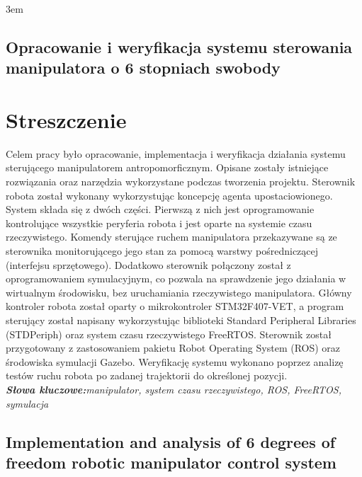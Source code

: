 \documentclass[a4paper, 12pt, twoside]{article}
\begin{document}
\emergencystretch 3em

\begin{figure}
\setlength{\voffset}{0cm}
\setlength{\hoffset}{0cm}
	
\setlength{\voffset}{-2.54cm}
\setlength{\hoffset}{-2.54cm}
\end{figure}
\mbox{}
\newpage
\thispagestyle{empty}
\mbox{}

\newpage
\begin{center}
\section*{Opracowanie i weryfikacja systemu sterowania manipulatora o 6 stopniach swobody}
\end{center}

\section*{Streszczenie}
\thispagestyle{empty}
\justify
Celem pracy było opracowanie, implementacja i weryfikacja działania systemu sterującego manipulatorem antropomorficznym. Opisane zostały istniejące rozwiązania oraz narzędzia wykorzystane podczas tworzenia projektu. Sterownik robota został wykonany wykorzystując koncepcję agenta upostaciowionego. System składa się z dwóch części. Pierwszą z nich jest oprogramowanie kontrolujące wszystkie peryferia robota i jest oparte na systemie czasu rzeczywistego. Komendy sterujące ruchem manipulatora przekazywane są ze sterownika monitorującego jego stan za pomocą warstwy pośredniczącej (interfejsu sprzętowego). Dodatkowo sterownik połączony został z oprogramowaniem symulacyjnym, co pozwala na sprawdzenie jego działania w wirtualnym środowisku, bez uruchamiania rzeczywistego manipulatora. Główny kontroler robota został oparty o mikrokontroler STM32F407-VET, a program sterujący został napisany wykorzystując biblioteki Standard Peripheral Libraries (STDPeriph) oraz system czasu rzeczywistego FreeRTOS. Sterownik został przygotowany z zastosowaniem pakietu Robot Operating System (ROS) oraz środowiska symulacji Gazebo. Weryfikację systemu wykonano poprzez analizę testów ruchu robota po zadanej trajektorii do określonej pozycji.
\vspace{0.5 cm}
\\
\textit{\textbf{Słowa kluczowe:}}\textit{manipulator, system czasu rzeczywistego, ROS, FreeRTOS, symulacja}


\newpage
\begin{center}
\section*{Implementation and analysis of 6 degrees of freedom robotic manipulator control system}
\end{center}
\end{document}
